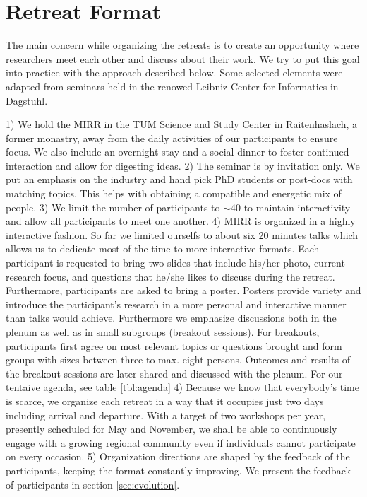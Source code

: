 \section{Retreat Format}

The main concern while organizing the retreats is to create an opportunity where researchers meet each other and discuss about their work. We try to put this goal into practice with the  approach described below. Some selected elements were adapted from seminars held in the renowed Leibniz Center for Informatics in Dagstuhl\cite{dagstuhl}.

1) We hold the MIRR in the \ac{TUM} Science and Study Center in Raitenhaslach, a former monastry, away from the daily activities of our participants to ensure focus. We also include an overnight stay and a social dinner to foster continued interaction and allow for digesting ideas.
2) The seminar is by invitation only. We put an emphasis on the industry and hand pick PhD students or post-docs with matching topics. This helps with obtaining a compatible and energetic mix of people.
3) We limit the number of participants to $\sim$40 to maintain interactivity and allow all
participants to meet one another.
4) MIRR is organized in a highly interactive fashion. So far we limited ourselfs to about six 20 minutes talks which allows us to dedicate most of the time to more interactive formats. Each participant is requested to bring two slides that include his/her photo, current research focus, and questions that he/she likes to discuss during the retreat. Furthermore, participants are asked to bring a poster. Posters provide variety and introduce the participant's research in a more personal and interactive manner than talks would achieve. Furthermore we emphasize discussions both in the plenum as well as in small subgroups (breakout sessions). For breakouts, participants first agree on most relevant topics or questions brought and form groups with sizes between three to max. eight persons. Outcomes and results of the breakout sessions are later shared and discussed with the plenum. For our tentaive agenda, see table \ref{tbl:agenda}
4) Because we know that everybody's time is scarce, we organize each retreat in a way that it occupies just two days including arrival and departure.  With a target of two workshops per year, presently scheduled for May and November, we shall be able to continuously
engage with a growing regional community even if individuals cannot
participate on every occasion.
5) Organization directions are shaped by the feedback of the participants, keeping the format constantly improving. We present the feedback of participants in section \ref{sec:evolution}.


